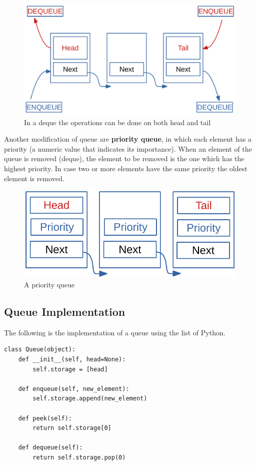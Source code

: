 \begin{figure}[H]
	\begin{center}
		\includegraphics[scale=.6]{chapters/datastructures/images/queue_2.pdf}
		\caption[In a deque the operations can be done on both head and tail]{In a deque the operations can be done on both head and tail}
		\label{queue_2}
	\end{center}
\end{figure}

Another modification of queue are \textbf{priority queue}, in which each element has a priority (a numeric value that indicates its importance). When an element of the queue is removed (deque), the element to be removed is the one which has the highest priority. In case two or more elements have the same priority the oldest element is removed.

\begin{figure}[H]
	\begin{center}
		\includegraphics[scale=.6]{chapters/datastructures/images/queue_3.pdf}
		\caption[A priority queue]{A priority queue}
		\label{queue_3}
	\end{center}
\end{figure}

\subsection{Queue Implementation}
The following is the implementation of a queue using the list of Python.
\begin{lstlisting}[firstnumber=1, caption={Queue implementation.}]
class Queue(object):
	def __init__(self, head=None):
		self.storage = [head]
	
	def enqueue(self, new_element):
		self.storage.append(new_element)
	
	def peek(self):
		return self.storage[0]
	
	def dequeue(self):
		return self.storage.pop(0)
\end{lstlisting}

